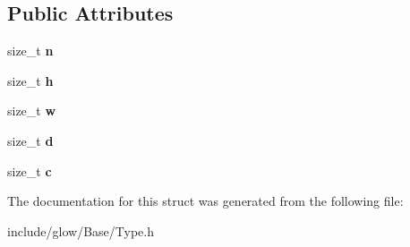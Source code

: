 \subsection*{Public Attributes}
\begin{DoxyCompactItemize}
\item 
\mbox{\label{structglow_1_1_shape_n_h_w_d_c_a1552549012cfc56aaeab27c88ccb654c}} 
size\+\_\+t {\bfseries n}
\item 
\mbox{\label{structglow_1_1_shape_n_h_w_d_c_ad5d4ea202afefac3ba4a6d9a45f151ad}} 
size\+\_\+t {\bfseries h}
\item 
\mbox{\label{structglow_1_1_shape_n_h_w_d_c_a44d1a78c136125877d0aa754063fbd13}} 
size\+\_\+t {\bfseries w}
\item 
\mbox{\label{structglow_1_1_shape_n_h_w_d_c_ac26962919cafe9ef366960fd3b764ff4}} 
size\+\_\+t {\bfseries d}
\item 
\mbox{\label{structglow_1_1_shape_n_h_w_d_c_a569b67d6cb3fb9e60f36291621955432}} 
size\+\_\+t {\bfseries c}
\end{DoxyCompactItemize}


The documentation for this struct was generated from the following file\+:\begin{DoxyCompactItemize}
\item 
include/glow/\+Base/Type.\+h\end{DoxyCompactItemize}

